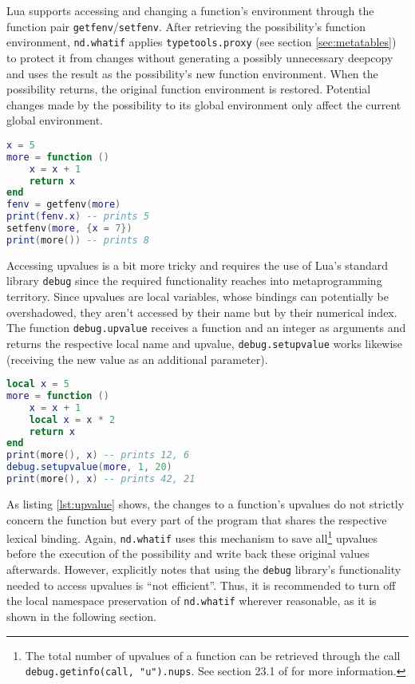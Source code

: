 Lua supports accessing and changing a function's environment through the function pair \texttt{getfenv}/\texttt{setfenv}. After retrieving the possibility's function environment, \texttt{nd.whatif} applies \texttt{typetools.proxy} (see section \ref{sec:metatables}) to protect it from changes without generating a possibly unnecessary deepcopy and uses the result as the possibility's new function environment. When the possibility returns, the original function environment is restored. Potential changes made by the possibility to its global environment only affect the current global environment.

\begin{lstlisting}[language=lua, caption={Changing a function's environment.}, label=lst:fenv, name=lst:fenv]
x = 5
more = function ()
	x = x + 1
	return x
end
fenv = getfenv(more)
print(fenv.x) -- prints 5
setfenv(more, {x = 7})
print(more()) -- prints 8
\end{lstlisting}

Accessing upvalues is a bit more tricky and requires the use of Lua's standard library \texttt{debug} since the required functionality reaches into metaprogramming territory. Since upvalues are local variables, whose bindings can potentially be overshadowed, they aren't accessed by their name but by their numerical index. The function \texttt{debug.upvalue} receives a function and an integer as arguments and returns the respective local name and upvalue, \texttt{debug.setupvalue} works likewise (receiving the new value as an additional parameter).

\begin{lstlisting}[language=lua, caption={Setting a function's upvalue "from the outside".}, label=lst:upvalue, name=lst:upvalue]
local x = 5
more = function ()
	x = x + 1
	local x = x * 2
	return x
end
print(more(), x) -- prints 12, 6
debug.setupvalue(more, 1, 20)
print(more(), x) -- prints 42, 21
\end{lstlisting}

As listing \ref{lst:upvalue} shows, the changes to a function's upvalues do not strictly concern the function but every part of the program that shares the respective lexical binding. Again, \texttt{nd.whatif} uses this mechanism to save all\footnote{The total number of upvalues of a function can be retrieved through the call \texttt{debug.getinfo(call, "u").nups}. See section 23.1 of \cite{Ierusalimschy2006} for more information.} upvalues before the execution of the possibility and write back these original values afterwards. However, \cite{Ierusalimschy2006} explicitly notes that using the \texttt{debug} library's functionality needed to access upvalues is ``not efficient''. Thus, it is recommended to turn off the local namespace preservation of \texttt{nd.whatif} wherever reasonable, as it is shown in the following section.

